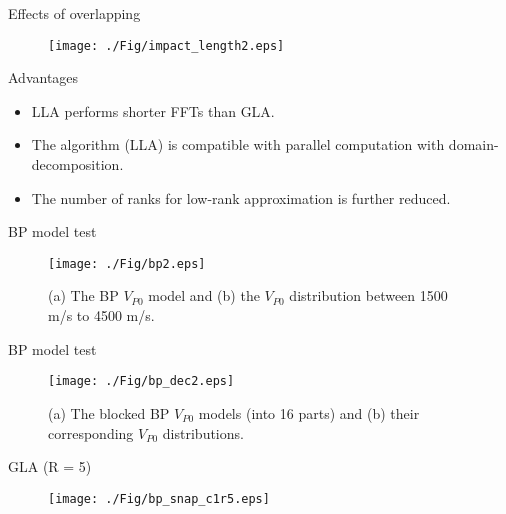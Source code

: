 \documentclass[aspectratio=169]{beamer}
\begin{document}
\begin{frame}{Effects of overlapping}
  \begin{figure}
  \texttt{[image: ./Fig/impact\_length2.eps]}
  \end{figure}
\end{frame}
\begin{frame}{Advantages}
\begin{itemize}
\item{LLA performs shorter FFTs than GLA.}
\item{The algorithm (LLA) is compatible with parallel computation with domain-decomposition.}
\item{The number of ranks for low-rank approximation is further reduced.}
\end{itemize}
\end{frame}
\begin{frame}{BP model test}
  \begin{figure}
  \texttt{[image: ./Fig/bp2.eps]}
  \caption {(a) The BP $V_{P0}$ model and (b) the $V_{P0}$ distribution between 1500 m/s to 4500 m/s.}
  \end{figure}
\end{frame}
\begin{frame}{BP model test}
  \begin{figure}
  \texttt{[image: ./Fig/bp\_dec2.eps]}
  \caption {
(a) The blocked BP $V_{P0}$ models (into 16 parts) and (b) their corresponding $V_{P0}$ distributions.
}
  \end{figure}
\end{frame}
\begin{frame}{GLA (R = 5)}
   \begin{figure}[ht]
   \texttt{[image: ./Fig/bp\_snap\_c1r5.eps]}
   \end{figure}
\end{frame}
\end{document}
